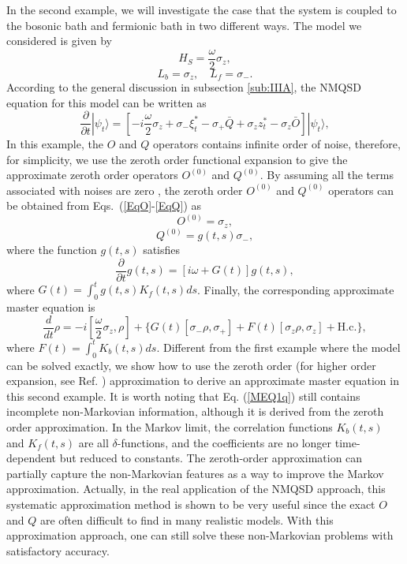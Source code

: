 \documentclass[preprint]{elsarticle}
\begin{document}
In the second example, we will investigate the case that the system
is coupled to the bosonic bath and fermionic bath in two different ways.
The model we considered is given by
\begin{equation}
H_{S}=\frac{\omega}{2}\sigma_{z},
\end{equation}
\begin{equation}
L_{b}=\sigma_{z},\quad L_{f}=\sigma_{-}.
\end{equation}
According to the general discussion in subsection \ref{sub:IIIA},
the NMQSD equation for this model can be written as
\begin{equation}
\frac{\partial}{\partial t}|\psi_{t}\rangle=[-i\frac{\omega}{2}\sigma_{z}+\sigma_{-}\xi_{t}^{\ast}-\sigma_{+}\bar{Q}+\sigma_{z}z_{t}^{*}-\sigma_{z}\bar{O}]|\psi_{t}\rangle,
\end{equation}
In this example, the $O$ and $Q$ operators contains infinite order
of noise, therefore, for simplicity, we use the zeroth order functional expansion
to give the approximate zeroth order operators $O^{(0)}$ and $Q^{(0)}$. By assuming all 
the terms associated with noises are zero \cite{Xu2014}, the zeroth order $O^{(0)}$ and $Q^{(0)}$ operators 
can be obtained from Eqs.~(\ref{EqO}-\ref{EqQ}) as
\begin{equation}
O^{(0)}=\sigma_{z},
\end{equation}
\begin{equation}
Q^{(0)}=g(t,s)\sigma_{-},
\end{equation}
where the function $g(t,s)$ satisfies
\begin{equation}
\frac{\partial}{\partial t}g(t,s)=[i\omega+G(t)]g(t,s),
\end{equation}
where $G(t)=\int_{0}^{t}g(t,s)K_{f}(t,s)ds$. Finally, the corresponding
approximate master equation is
\begin{equation}
\frac{d}{dt}\rho=-i[\frac{\omega}{2}\sigma_{z},\rho]+\{G(t)[\sigma_{-}\rho,\sigma_{+}]+F(t)[\sigma_{z}\rho,\sigma_{z}]+\mathrm{H.c.}\}, \label{MEQ1q}
\end{equation}
where $F(t)=\int_{0}^{t}K_{b}(t,s)ds$. Different from the first example
where the model can be solved exactly, we show how to use the zeroth
order (for higher order expansion, see Ref. \cite{Xu2014}) approximation to derive an approximate master
equation in this second example. It is worth noting that Eq. (\ref{MEQ1q}) still contains incomplete non-Markovian information, although it is derived from the zeroth order 
approximation. In the Markov limit, the correlation functions $K_b(t,s)$ and $K_f(t,s)$ are all $\delta$-functions, and the coefficients are no longer 
time-dependent but reduced to constants. The zeroth-order approximation can partially capture the non-Markovian features as a way to improve
 the Markov approximation. Actually, in the real application
of the NMQSD approach, this systematic approximation method is shown to be very useful since the exact $O$ and $Q$ are often difficult to find
in many realistic models. With this approximation approach, one can still solve these non-Markovian problems with satisfactory accuracy.
\end{document}
